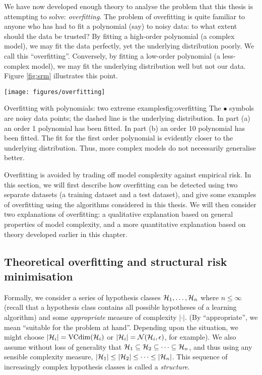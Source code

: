 We have now developed enough theory to analyse the problem that
this thesis is attempting to solve: \emph{overfitting}.  The problem
of overfitting is quite familiar to anyone who has had to fit a
polynomial (say) to noisy data: to what extent should the data be
trusted?  By fitting a high-order polynomial (a complex model), we may
fit the data perfectly, yet the underlying distribution poorly.  We
call this ``overfitting''.  Conversely, by fitting a low-order
polynomial (a less-complex model), we may fit the underlying
distribution well but not our data.  Figure \ref{fig:srm} illustrates
this point.

\begin{linefigure}
\begin{center}
\texttt{[image: figures/overfitting]}
\end{center}
\begin{capt}{Overfitting with polynomials: two extreme
examples}{fig:overfitting}
The $\bullet$ symbols are noisy data points; the dashed line is the
underlying distribution.  In part (a) an order 1 polynomial has been
fitted.  In part (b) an order 10 polynomial has been fitted.  The fit
for the first order polynomial is evidently closer to the underlying
distribution.  Thus, more complex models do not necessarily generalise
better.
\end{capt}
\end{linefigure}

Overfitting is avoided by trading off model complexity against
empirical risk.  In this section, we will first describe how 
overfitting can be detected using two separate datasets (a training
dataset and a test dataset), and give some examples of overfitting
using the algorithms considered in this thesis.  We will then consider
two explanations of overfitting: a qualitative explanation based on
general properties of model complexity, and a more quantitative
explanation based on theory developed earlier in this chapter.


\subsection{Theoretical overfitting and structural risk minimisation}
\label{sec:theoretical overfitting}
\label{acr:srm}

Formally, we consider a series of hypothesis classes $\mathcal{H}_1, \ldots,
\mathcal{H}_n$ where $n \leq \infty$ (recall that a hypothesis class contains all
possible hypotheses of a learning algorithm) and some
\emph{appropriate} measure of complexity  $|\cdot|$.  (By
``appropriate'', we mean ``suitable for the problem at
hand''. Depending upon the situation, we might choose $|\mathcal{H}_i| =
\mathrm{VCdim}(\mathcal{H}_i)$ or $|\mathcal{H}_i| = \mathcal{N}({\mathcal{H}_i}, {\epsilon})$, for
example).  We also assume without loss of generality that $\mathcal{H}_1
\subseteq \mathcal{H}_2 \subseteq \cdots \subseteq \mathcal{H}_n$, and thus using
any sensible complexity measure, $|\mathcal{H}_1| \leq |\mathcal{H}_2| \leq \cdots
\leq |\mathcal{H}_n|$.  This sequence of increasingly complex hypothesis
classes is called a \emph{structure}.


